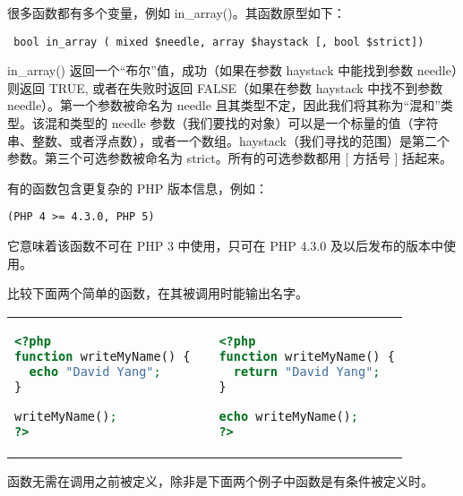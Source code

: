 很多函数都有多个变量，例如 in\_array()。其函数原型如下：

\begin{verbatim}
 bool in_array ( mixed $needle, array $haystack [, bool $strict])
\end{verbatim}

 in\_array() 返回一个“布尔”值，成功（如果在参数 haystack 中能找到参数 needle）则返回 TRUE, 或者在失败时返回 FALSE（如果在参数 haystack 中找不到参数 needle）。第一个参数被命名为 needle 且其类型不定，因此我们将其称为“混和”类型。该混和类型的 needle 参数（我们要找的对象）可以是一个标量的值（字符串、整数、或者浮点数），或者一个数组。haystack（我们寻找的范围）是第二个参数。第三个可选参数被命名为 strict。所有的可选参数都用 [ 方括号 ] 括起来。


有的函数包含更复杂的 PHP 版本信息，例如：

\begin{verbatim}
(PHP 4 >= 4.3.0, PHP 5)
\end{verbatim}

它意味着该函数不可在 PHP 3 中使用，只可在 PHP 4.3.0 及以后发布的版本中使用。






比较下面两个简单的函数，在其被调用时能输出名字。

\vspace{-20pt}

\begin{tabular}{m{180pt}m{5pt}m{180pt}}
\begin{lstlisting}[language=PHP]
<?php
function writeMyName() {
  echo "David Yang";
}

writeMyName();
?>
\end{lstlisting} && 
\begin{lstlisting}[language=PHP]
<?php
function writeMyName() {
  return "David Yang";
}

echo writeMyName();
?>
\end{lstlisting}\\
\end{tabular}

\vspace{-20pt}



函数无需在调用之前被定义，除非是下面两个例子中函数是有条件被定义时。

